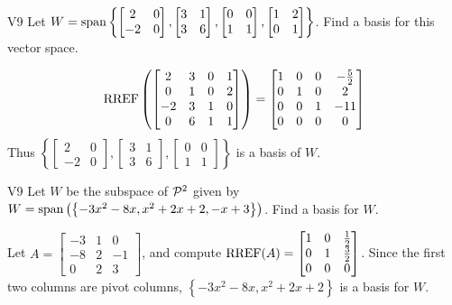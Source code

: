 \begin{problem}{V9}
Let \(
  W=\vspan\left\{
    \begin{bmatrix} 2 & 0 \\ -2 & 0 \end{bmatrix},
    \begin{bmatrix} 3 & 1 \\ 3 & 6 \end{bmatrix},
    \begin{bmatrix} 0 & 0 \\ 1 & 1 \end{bmatrix},
    \begin{bmatrix} 1 & 2 \\ 0 & 1 \end{bmatrix}
  \right\}
\). Find a basis for this vector space.
\end{problem}
\begin{solution}
\[
  \RREF\left(\begin{bmatrix}
    2 & 3 & 0 & 1 \\
    0 & 1 & 0 & 2 \\
    -2 & 3 & 1 & 0 \\
    0 & 6 & 1 & 1
  \end{bmatrix} \right) =
  \begin{bmatrix}
    1 & 0 & 0 & -\frac{5}{2} \\
    0 & 1 & 0 & 2 \\
    0 & 0 & 1 & -11\\
    0 & 0 & 0 & 0
  \end{bmatrix}
\]
Thus \(\left\{
  \begin{bmatrix} 2 & 0 \\ -2 & 0 \end{bmatrix},
  \begin{bmatrix} 3 & 1 \\ 3 & 6 \end{bmatrix},
  \begin{bmatrix} 0 & 0 \\ 1 & 1 \end{bmatrix}
\right\}\) is a basis of \(W\).
\end{solution}

\begin{problem}{V9}
Let \(W\) be the subspace of \(\P^2\) given by \(W = \vspan \left( \left\{  -3x^2-8x, x^2+2x+2, -x+3\right\} \right)\).   Find a basis for \(W\).
\end{problem}
\begin{solution}
Let \(A= \begin{bmatrix}-3 & 1 & 0 \\ -8 & 2 & -1 \\ 0 & 2 & 3\end{bmatrix}\), and compute \(\RREF(A) = \begin{bmatrix} 1 & 0 & \frac{1}{2} \\ 0 & 1 & \frac{3}{2} \\ 0 & 0 & 0 \end{bmatrix}\).
Since the first two columns are pivot columns, \(\left\{ -3x^2-8x, x^2+2x+2\right\} \) is a basis for \(W\).
\end{solution}

